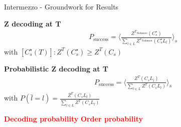\documentclass{dfki}
\begin{document}

\begin{frame}{Intermezzo - Groundwork for Results}
	\begin{minipage}{0.48\textwidth}
		\small
		\textbf{Z decoding at T}
		\begin{align*}
			&P_{\text{success}}=\langle\frac{Z^{T_{\text{Nishimori}}}(C^{\star}_{s})}{\sum_{l\in L}Z^{T_{\text{Nishimori}}}(C^{\star}_{s}L_{l})}\rangle_{s}
		\end{align*}
		with $[C^{\star}_{s}(T)]: Z^{T}(C^{\star}_{s})\geq Z^{T}(C_{s})$
    \end{minipage}
    \hfill
	\pause
    \begin{minipage}{0.48\textwidth}
        \small
		\textbf{Probabilistic Z decoding at T}
		\begin{align*}
			&P_{\text{success}}=\langle\frac{Z^{T}(C_{s}L_{\bar{l}})}{\sum_{l\in L}Z^{T}(C_{s}L_{l})}\rangle_{s}
		\end{align*}
		with $P(\bar{l}=l)=\frac{Z^{T}(C_{s}L_{l})}{\sum_{l\in L}Z^{T}(C_{s}L_{l})}$
    \end{minipage}
	\pause
	\textcolor{red}{\textbf{Decoding probability}}
	\hspace{3cm}
	\textcolor{red}{\textbf{Order probability}}
\end{frame}
\end{document}
